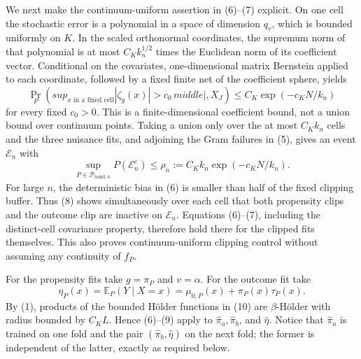 We next make the continuum-uniform assertion in (6)--(7) explicit.  On one
cell the stochastic error is a polynomial in a space of dimension \(q_v\),
which is bounded uniformly on \(K\).  In the scaled orthonormal coordinates,
the supremum norm of that polynomial is at most \(C_K k_n^{1/2}\) times the
Euclidean norm of its coefficient vector.  Conditional on the covariates,
one-dimensional matrix Bernstein applied to each coordinate, followed by a
fixed finite net of the coefficient sphere, yields
\[
\Pr_P\!\left(sup_{x\text{ in a fixed cell}}|\zeta_g(x)|>c_0
\,middle|,X_J\right)
\le C_K\exp(-c_KN/k_n)
\tag{8}
\]
for every fixed \(c_0>0\).  This is a finite-dimensional coefficient bound,
not a union bound over continuum points.  Taking a union only over the at
most \(C_Kk_n\) cells and the three nuisance fits, and adjoining the Gram
failures in (5), gives an event \(\mathcal E_n\) with
\[
\sup_{P\in\mathcal P_{\mathrm{band},n}}P(\mathcal E_n^c)
\le \rho_n:=C_Kk_n\exp(-c_KN/k_n).
\tag{9}
\]
For large \(n\), the deterministic bias in (6) is smaller than half of the
fixed clipping buffer.  Thus (8) shows simultaneously over each cell that
both propensity clips and the outcome clip are inactive on \(\mathcal E_n\).
Equations (6)--(7), including the distinct-cell covariance property, therefore
hold there for the clipped fits themselves.  This also proves continuum-uniform
clipping control without assuming any continuity of \(f_P\).

For the propensity fits take \(g=\pi_P\) and \(v=\alpha\).  For the outcome
fit take
\[
\eta_P(x)=\mathbb E_P(Y\mid X=x)
=\mu_{0,P}(x)+\pi_P(x)\tau_P(x).
\tag{10}
\]
By (1), products of the bounded H\"older functions in (10) are
\(\beta\)-H\"older with radius bounded by \(C_KL\).  Hence (6)--(9) apply
to \(\widehat\pi_a,\widehat\pi_b\), and \(\widehat\eta\).  Notice that
\(\widehat\pi_a\) is trained on one fold and the pair
\((\widehat\pi_b,\widehat\eta)\) on the next fold; the former is independent
of the latter, exactly as required below.

